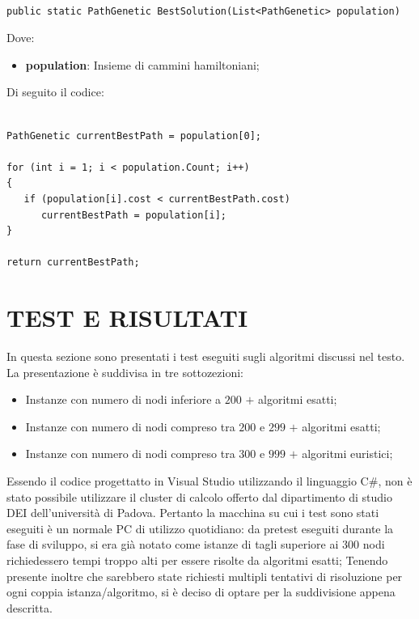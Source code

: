 \documentclass[11pt]{article}
\begin{document}
\begin{lstlisting}

public static PathGenetic BestSolution(List<PathGenetic> population)

\end{lstlisting}

Dove:

\begin{itemize}
    \item \textbf{population}: Insieme di cammini hamiltoniani;
\end{itemize}

Di seguito il codice:

\begin{lstlisting}

PathGenetic currentBestPath = population[0];

for (int i = 1; i < population.Count; i++)
{
   if (population[i].cost < currentBestPath.cost)
      currentBestPath = population[i];
}

return currentBestPath;

\end{lstlisting}

\section*{TEST E RISULTATI}

In questa sezione sono presentati i test eseguiti sugli algoritmi discussi nel testo. La presentazione è suddivisa in tre sottozezioni:
\begin{itemize}
    \item Instanze con numero di nodi inferiore a \textbf{$200$} $+$ algoritmi esatti;
    \item Instanze con numero di nodi compreso tra \textbf{$200$} e \textbf{$299$} $+$ algoritmi esatti;
    \item Instanze con numero di nodi compreso tra \textbf{$300$} e \textbf{$999$} $+$ algoritmi euristici;
\end{itemize}
Essendo il codice progettatto in Visual Studio utilizzando il linguaggio C\#, non è stato possibile utilizzare il cluster di calcolo offerto dal dipartimento di studio DEI dell'università di Padova. Pertanto la macchina su cui i test sono stati eseguiti è un normale PC di utilizzo quotidiano: da pretest eseguiti durante la fase di sviluppo, si era già notato come istanze di tagli superiore ai $300$ nodi richiedessero tempi troppo alti per essere risolte da algoritmi esatti; Tenendo presente inoltre che sarebbero state richiesti multipli tentativi di risoluzione per ogni coppia istanza/algoritmo, si è deciso di optare per la suddivisione appena descritta.
\end{document}
